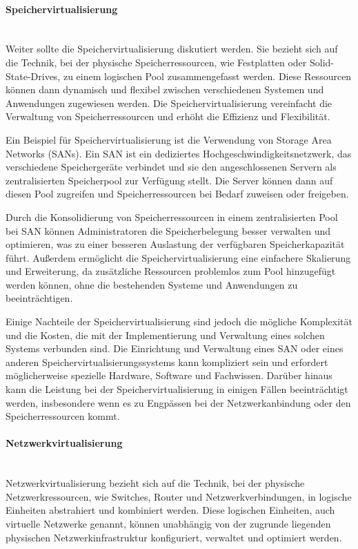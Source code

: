 \documentclass[../vs-script-first-v01.tex]{subfiles}
\begin{document}
\paragraph{Speichervirtualisierung\\\\}
Weiter sollte die Speichervirtualisierung diskutiert werden. Sie bezieht sich auf die Technik, bei der physische Speicherressourcen, wie Festplatten oder Solid-State-Drives, zu einem logischen Pool zusammengefasst werden. Diese Ressourcen können dann dynamisch und flexibel zwischen verschiedenen Systemen und Anwendungen zugewiesen werden. Die Speichervirtualisierung vereinfacht die Verwaltung von Speicherressourcen und erhöht die Effizienz und Flexibilität.

Ein Beispiel für Speichervirtualisierung ist die Verwendung von Storage Area Networks (SANs). Ein SAN ist ein dediziertes Hochgeschwindigkeitsnetzwerk, das verschiedene Speichergeräte verbindet und sie den angeschlossenen Servern als zentralisierten Speicherpool zur Verfügung stellt. Die Server können dann auf diesen Pool zugreifen und Speicherressourcen bei Bedarf zuweisen oder freigeben.

Durch die Konsolidierung von Speicherressourcen in einem zentralisierten Pool bei SAN können Administratoren die Speicherbelegung besser verwalten und optimieren, was zu einer besseren Auslastung der verfügbaren Speicherkapazität führt. Außerdem ermöglicht die Speichervirtualisierung eine einfachere Skalierung und Erweiterung, da zusätzliche Ressourcen problemlos zum Pool hinzugefügt werden können, ohne die bestehenden Systeme und Anwendungen zu beeinträchtigen.

Einige Nachteile der Speichervirtualisierung sind jedoch die mögliche Komplexität und die Kosten, die mit der Implementierung und Verwaltung eines solchen Systems verbunden sind. Die Einrichtung und Verwaltung eines SAN oder eines anderen Speichervirtualisierungssystems kann kompliziert sein und erfordert möglicherweise spezielle Hardware, Software und Fachwissen. Darüber hinaus kann die Leistung bei der Speichervirtualisierung in einigen Fällen beeinträchtigt werden, insbesondere wenn es zu Engpässen bei der Netzwerkanbindung oder den Speicherressourcen kommt.
\paragraph{Netzwerkvirtualisierung\\\\}
Netzwerkvirtualisierung bezieht sich auf die Technik, bei der physische Netzwerkressourcen, wie Switches, Router und Netzwerkverbindungen, in logische Einheiten abstrahiert und kombiniert werden. Diese logischen Einheiten, auch virtuelle Netzwerke genannt, können unabhängig von der zugrunde liegenden physischen Netzwerkinfrastruktur konfiguriert, verwaltet und optimiert werden. 
\end{document}

